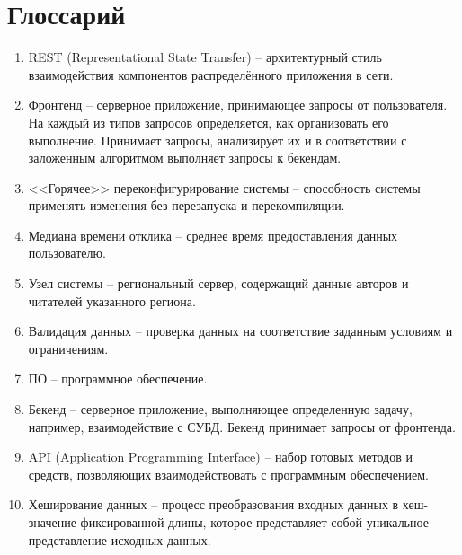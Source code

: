 \section*{Глоссарий}
\begin{enumerate}
  \item REST (Representational State Transfer) -- архитектурный стиль взаимодействия компонентов распределённого приложения в сети. 
  
  \item Фронтенд -- серверное приложение, принимающее запросы от пользователя. На каждый из типов запросов определяется, как организовать его выполнение. Принимает запросы, анализирует их и в соответствии с заложенным алгоритмом выполняет запросы к бекендам.
  
  \item <<Горячее>> переконфигурирование системы -- способность системы применять изменения без перезапуска и перекомпиляции.
  
  \item Медиана времени отклика -- среднее время предоставления данных пользователю.
  
  \item Узел системы -- региональный сервер, содержащий данные авторов и читателей указанного региона.
  
  \item Валидация данных  -- проверка данных на соответствие заданным условиям и ограничениям.
  
  \item ПО -- программное обеспечение.
  
  \item Бекенд -- серверное приложение, выполняющее определенную задачу, например, взаимодействие с СУБД. Бекенд принимает запросы от фронтенда.

  \item API (Application Programming Interface) -- набор готовых методов и средств, позволяющих взаимодействовать с программным обеспечением.
  
  \item Хеширование данных -- процесс преобразования входных данных в хеш-значение фиксированной длины, которое представляет собой уникальное представление исходных данных.
\end{enumerate}